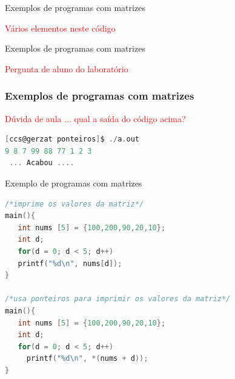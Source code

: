 \begin{frame}{Exemplos de programas com matrizes}



\pause
\textcolor{red}{Vários elementos neste código}

\end{frame}


\begin{frame}{Exemplos de programas com matrizes}



\pause
\textcolor{red}{Pergunta de aluno do  laboratório}

\end{frame}



\begin{frame}

\frametitle{Exemplos de programas com matrizes}


\textcolor{red}{Dúvida de aula ... qual a saída do código acima?}

\pause

\begin{lstlisting}[language=C]
[ccs@gerzat ponteiros]$ ./a.out 
9 8 7 99 88 77 1 2 3 
 ... Acabou ....
\end{lstlisting}

\end{frame}





\begin{frame}{Exemplo de programas com matrizes}
\begin{lstlisting}[language=C]
/*imprime os valores da matriz*/
main(){
   int nums [5] = {100,200,90,20,10};
   int d;
   for(d = 0; d < 5; d++)
   printf("%d\n", nums[d]);
}

/*usa ponteiros para imprimir os valores da matriz*/
main(){
   int nums [5] = {100,200,90,20,10};
   int d;
   for(d = 0; d < 5; d++)
     printf("%d\n", *(nums + d));
}
\end{lstlisting}
\end{frame}

